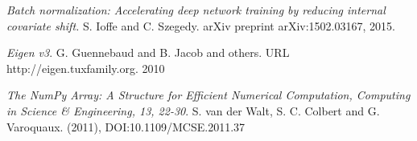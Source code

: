 \documentclass[a4paper, twoside]{article}
\begin{document}
\begin{thebibliography}{99}
	\textit{Batch normalization: Accelerating deep network training by reducing internal covariate shift.}
    S. Ioffe and C. Szegedy. 
	arXiv preprint arXiv:1502.03167, 2015.

\textit{Eigen v3}.
G. Guennebaud and B. Jacob and others. URL http://eigen.tuxfamily.org. 2010

\textit{The NumPy Array: A Structure for Efficient Numerical Computation, Computing in Science \& Engineering, 13, 22-30}.
S. van der Walt, S. C. Colbert and G. Varoquaux.  (2011), DOI:10.1109/MCSE.2011.37 

\end{thebibliography}
\end{document}
